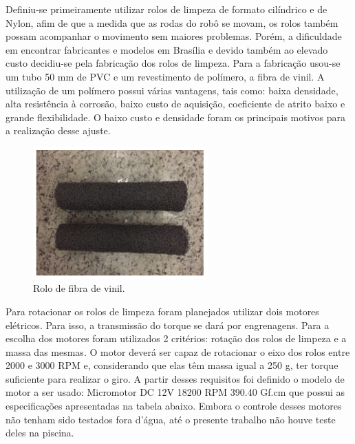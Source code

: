 Definiu-se primeiramente utilizar rolos de limpeza de formato cilíndrico e de \textsf{Nylon}, afim de que a medida que as rodas do robô se movam, os rolos também possam acompanhar o movimento sem maiores problemas. Porém, a dificuldade em encontrar fabricantes e modelos em Brasília e devido também ao elevado custo decidiu-se pela fabricação dos rolos de limpeza. Para a fabricação usou-se um tubo 50 mm de PVC e um revestimento de polímero, a fibra de vinil.  A utilização de um polímero possui várias vantagens, tais como: baixa densidade, alta resistência à corrosão, baixo custo de aquisição, coeficiente de atrito baixo e grande flexibilidade. O baixo custo e densidade foram os principais motivos para a realização desse ajuste.

\begin{figure}[h]
  \centering
  \includegraphics[width=0.6\textwidth]{figuras/rolo-fim.png}
  \caption{Rolo de fibra de vinil.}
  \label{fig:rolo-fim}
\end{figure}
\FloatBarrier

Para rotacionar os rolos de limpeza foram planejados utilizar dois motores elétricos. Para isso, a transmissão do torque se dará por engrenagens. Para a escolha dos motores foram utilizados 2 critérios: rotação dos rolos de limpeza e a massa das mesmas. O motor deverá ser capaz de rotacionar o eixo dos rolos entre 2000 e 3000 RPM e, considerando que elas têm massa igual a 250 g, ter torque suficiente para realizar o giro. A partir desses requisitos foi definido  o modelo de motor a ser usado: Micromotor DC 12V 18200 RPM 390.40 Gf.cm que possui as especificações apresentadas na tabela abaixo. Embora o controle desses motores não tenham sido testados fora d’água, até o presente trabalho não houve teste deles na piscina. 

